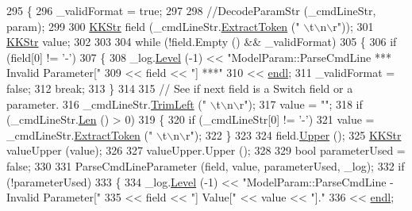 \begin{DoxyCode}
295 \{
296   \_validFormat = \textcolor{keyword}{true};
297 
298   \textcolor{comment}{//DecodeParamStr (\_cmdLineStr, param);}
299 
300   \hyperlink{class_k_k_b_1_1_k_k_str}{KKStr}  field (\_cmdLineStr.\hyperlink{class_k_k_b_1_1_k_k_str_acc31c95308d6d699debde883c11e5802}{ExtractToken} (\textcolor{stringliteral}{" \(\backslash\)t\(\backslash\)n\(\backslash\)r"}));
301   \hyperlink{class_k_k_b_1_1_k_k_str}{KKStr}  value;
302 
303 
304   \textcolor{keywordflow}{while}  (!field.Empty ()  &&  \_validFormat)
305   \{
306     \textcolor{keywordflow}{if}  (field[0] != \textcolor{charliteral}{'-'})  
307     \{
308       \_log.\hyperlink{class_k_k_b_1_1_run_log_a32cf761d7f2e747465fd80533fdbb659}{Level} (-1) << \textcolor{stringliteral}{"ModelParam::ParseCmdLine  *** Invalid Parameter["}
309         << field << \textcolor{stringliteral}{"] ***"}
310         << \hyperlink{namespace_k_k_b_ad1f50f65af6adc8fa9e6f62d007818a8}{endl};
311       \_validFormat = \textcolor{keyword}{false};
312       \textcolor{keywordflow}{break};
313     \}
314 
315     \textcolor{comment}{// See if next field is a Switch field or a parameter.}
316     \_cmdLineStr.\hyperlink{class_k_k_b_1_1_k_k_str_af7c102c53103ddff3f48270b4a198c89}{TrimLeft} (\textcolor{stringliteral}{" \(\backslash\)t\(\backslash\)n\(\backslash\)r"});
317     value = \textcolor{stringliteral}{""};
318     \textcolor{keywordflow}{if}  (\_cmdLineStr.\hyperlink{class_k_k_b_1_1_k_k_str_a869142d4855517c5c237afcb25dbbe36}{Len} () > 0)
319     \{
320       \textcolor{keywordflow}{if}  (\_cmdLineStr[0] != \textcolor{charliteral}{'-'})
321         value = \_cmdLineStr.\hyperlink{class_k_k_b_1_1_k_k_str_acc31c95308d6d699debde883c11e5802}{ExtractToken} (\textcolor{stringliteral}{" \(\backslash\)t\(\backslash\)n\(\backslash\)r"});
322     \}
323 
324     field.\hyperlink{class_k_k_b_1_1_k_k_str_a66ea0feabc94da88591b56a683695bd9}{Upper} ();
325     \hyperlink{class_k_k_b_1_1_k_k_str}{KKStr} valueUpper (value);
326 
327     valueUpper.Upper ();
328 
329     \textcolor{keywordtype}{bool}  parameterUsed = \textcolor{keyword}{false};
330 
331     ParseCmdLineParameter (field, value, parameterUsed, \_log);
332     \textcolor{keywordflow}{if}  (!parameterUsed)
333     \{
334       \_log.\hyperlink{class_k_k_b_1_1_run_log_a32cf761d7f2e747465fd80533fdbb659}{Level} (-1) << \textcolor{stringliteral}{"ModelParam::ParseCmdLine - Invalid Parameter["}  
335         << field << \textcolor{stringliteral}{"]  Value["} << value << \textcolor{stringliteral}{"]."}
336         << \hyperlink{namespace_k_k_b_ad1f50f65af6adc8fa9e6f62d007818a8}{endl};

\end{DoxyCode}
